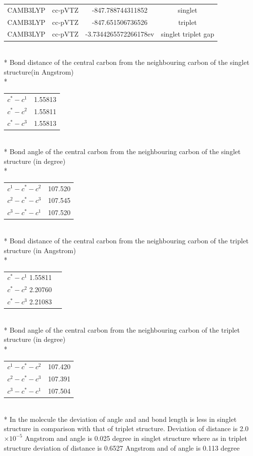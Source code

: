 \documentclass{article}
\begin{document}
\begin{tabular}{c c c c}
CAMB3LYP & cc-pVTZ & -847.788744311852  & singlet\\
CAMB3LYP & cc-pVTZ & -847.651506736526  & triplet\\

CAMB3LYP & cc-pVTZ & -3.7344265572266178ev & singlet triplet gap\\
\end{tabular}\\*
Bond distance of the central carbon from the neighbouring carbon of the singlet structure(in Angstrom)\\*
\begin{tabular}{c c}
\(c^{*}-c^{1}\) & 1.55813 \\
\(c^{*}-c^{2}\) & 1.55811 \\
\(c^{*}-c^{3}\) & 1.55813 \\
\end{tabular}\\*
Bond angle of the central carbon from the neighbouring carbon of the singlet structure (in degree)\\*
\begin{tabular}{c c}
\(c^{1}-c^{*}-c^{2}\) & 107.520\\
\(c^{2}-c^{*}-c^{3}\) & 107.545\\
\(c^{3}-c^{*}-c^{1}\) & 107.520\\
\end{tabular}\\*
Bond distance of the central carbon from the neighbouring carbon of the triplet structure (in Angstrom)\\*
\begin{tabular}{c c}
\(c^{*}-c^{1}\) 1.55811 \\
\(c^{*}-c^{2}\) 2.20760 \\
\(c^{*}-c^{3}\) 2.21083 \\
\end{tabular}\\*
Bond angle of the central carbon from the neighbouring carbon of the triplet structure (in degree)\\*
\begin{tabular}{c c}
\(c^{1}-c^{*}-c^{2}\) & 107.420 \\
\(c^{2}-c^{*}-c^{3}\) & 107.391 \\
\(c^{3}-c^{*}-c^{1}\) & 107.504 \\
\end{tabular}\\*
In the molecule the deviation of angle and and bond length is less in singlet structure in comparison with that of triplet structure.
Deviation of distance is 2.0 \( \times 10^{-5} \) Angstrom and angle is 0.025 degree in singlet structure where as in triplet structure deviation of distance is 0.6527 Angstrom and of angle is 0.113 degree
\end{document}

